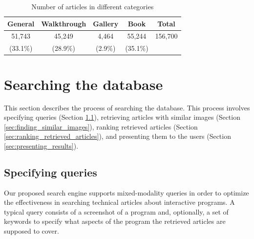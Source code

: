 \documentclass{www2010-submission}
\begin{document}
\begin{table}
\centering \caption{Number of articles in different categories}
\label{tbl:category_distribution}

\begin{tabular}{|c|c|c|c||c|}
\hline
      General & Walkthrough & Gallery & Book & Total\\
\hline
 51,743 & 45,249 & 4,464 & 55,244 & 156,700\\
 
 (33.1\%) & (28.9\%) & (2.9\%) & (35.1\%) & \\
\hline
\end{tabular}

\end{table}





\section{Searching the database}
\label{sec:searching}

This section describes the process of searching the database. This
process involves specifying queries (Section
\ref{sec:specifying_queries}), 
retrieving articles with similar
images (Section \ref{sec:finding_similar_images}), ranking retrieved
articles
(Section \ref{sec:ranking_retrieved_articles}), and presenting them to
the users
(Section \ref{sec:presenting_results}).

\subsection{Specifying queries}
\label{sec:specifying_queries}

Our proposed search engine supports mixed-modality queries in order to
optimize the effectiveness in searching technical articles about
interactive programs. A typical query consists of a screenshot of a
program and, optionally, a set of keywords to specify what aspects of
the program the retrieved articles are supposed to cover.
\end{document}
